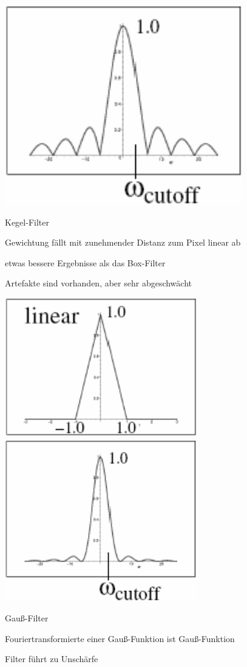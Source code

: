 \documentclass[landscape]{article}
\begin{document}
\begin{multicols}{3}
\begin{description*}
\begin{itemize*}
\begin{center}
        \includegraphics[width=.4\linewidth]{Assets/Computergrafik_Box-filter2}
      \end{center}
    \end{itemize*}
    \item[Kegel-Filter]
    \begin{itemize*}
      \item Gewichtung fällt mit zunehmender Distanz zum Pixel linear ab
      \item etwas bessere Ergebnisse als das Box-Filter
      \item Artefakte sind vorhanden, aber sehr abgeschwächt
      \begin{center}
        \includegraphics[width=.4\linewidth]{Assets/Computergrafik_Kegel-filter1}
        \includegraphics[width=.4\linewidth]{Assets/Computergrafik_Kegel-filter2}
      \end{center}
    \end{itemize*}
    \item[Gauß-Filter]
    \begin{itemize*}
      \item Fouriertransformierte einer Gauß-Funktion ist Gauß-Funktion
      \item Filter führt zu Unschärfe

\end{itemize*}
\end{description*}
\end{multicols}
\end{document}
